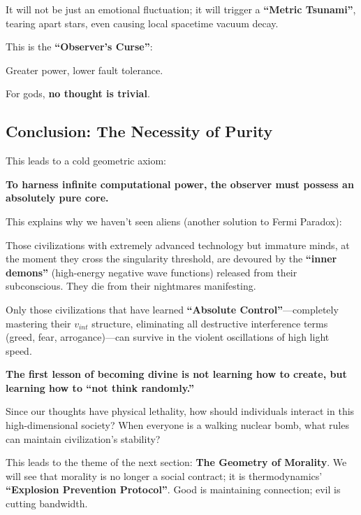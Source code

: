 It will not be just an emotional fluctuation; it will trigger a \textbf{``Metric Tsunami''}, tearing apart stars, even causing local spacetime vacuum decay.

This is the \textbf{``Observer's Curse''}:

Greater power, lower fault tolerance.

For gods, \textbf{no thought is trivial}.

\subsection{Conclusion: The Necessity of Purity}

This leads to a cold geometric axiom:

\textbf{To harness infinite computational power, the observer must possess an absolutely pure core.}

This explains why we haven't seen aliens (another solution to Fermi Paradox):

Those civilizations with extremely advanced technology but immature minds, at the moment they cross the singularity threshold, are devoured by the \textbf{``inner demons''} (high-energy negative wave functions) released from their subconscious. They die from their nightmares manifesting.

Only those civilizations that have learned \textbf{``Absolute Control''}---completely mastering their $v_{int}$ structure, eliminating all destructive interference terms (greed, fear, arrogance)---can survive in the violent oscillations of high light speed.

\textbf{The first lesson of becoming divine is not learning how to create, but learning how to ``not think randomly.''}

Since our thoughts have physical lethality, how should individuals interact in this high-dimensional society? When everyone is a walking nuclear bomb, what rules can maintain civilization's stability?

This leads to the theme of the next section: \textbf{The Geometry of Morality}. We will see that morality is no longer a social contract; it is thermodynamics' \textbf{``Explosion Prevention Protocol''}. Good is maintaining connection; evil is cutting bandwidth.

